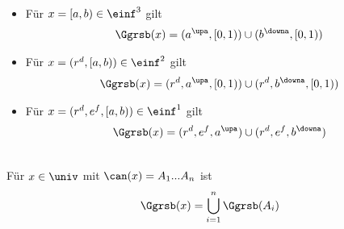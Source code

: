 \begin{hyp}\ 
    \begin{itemize}
        \item Für $x = [a,b) \in \einf^3$ gilt
            \begin{align*}
                \Ggrsb(x) = (a^\upa, [0,1)) \cup (b^\downa, [0,1))
            \end{align*}
        \item Für $x = (r^d,[a,b)) \in \einf^2$ gilt
            \begin{align*}
                \Ggrsb(x) = (r^d, a^\upa, [0,1)) \cup (r^d, b^\downa, [0,1))
            \end{align*}
        \item Für $x = (r^d,e^f,[a,b)) \in \einf^1$ gilt
            \begin{align*}
                \Ggrsb(x) = (r^d,e^f, a^\upa) \cup (r^d, e^f, b^\downa)
            \end{align*}
    \end{itemize}
\end{hyp}

\begin{hyp}\ \\
    Für $x \in \univ$ mit $\can(x) = A_1 ... A_n$ ist
    \begin{align*}
        \Ggrsb(x) = \bigcup_{i=1}^n \Ggrsb(A_i)
    \end{align*}
\end{hyp}




